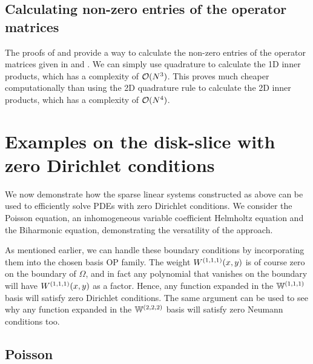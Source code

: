 \subsection{Calculating non-zero entries of the operator matrices}\label{subsection:Computation-operatormatrices}

The proofs of  and  provide a way to calculate the non-zero entries of the operator matrices given in  and . We can simply use quadrature to calculate the 1D inner products, which has a complexity of $\mathcal{O}(N^3)$. This proves much cheaper computationally than using the 2D quadrature rule to calculate the 2D inner products, which has a complexity of $\mathcal{O}(N^4)$. 


%
\section{Examples on the disk-slice with zero Dirichlet conditions}\label{Section:Examples}

We now demonstrate how the sparse linear systems constructed as above can be used to efficiently solve PDEs with zero Dirichlet conditions. We consider the Poisson equation, an inhomogeneous variable coefficient Helmholtz equation and the Biharmonic equation, demonstrating the versatility of the approach.

As mentioned earlier, we can handle these boundary conditions by incorporating them into the chosen basis OP family. The weight $W^{(1,1,1)}(x,y)$ is of course zero on the boundary of $\Omega$, and in fact any polynomial that vanishes on the boundary will have $W^{(1,1,1)}(x,y)$ as a factor. Hence, any function expanded in the ${\mathbb{W}^{(1,1,1)}}$ basis will satisfy zero Dirichlet conditions. The same argument can be used to see why any function expanded in the $\mathbb{W}^{(2,2,2)}$ basis will satisfy zero Neumann conditions too.

\subsection{Poisson}

